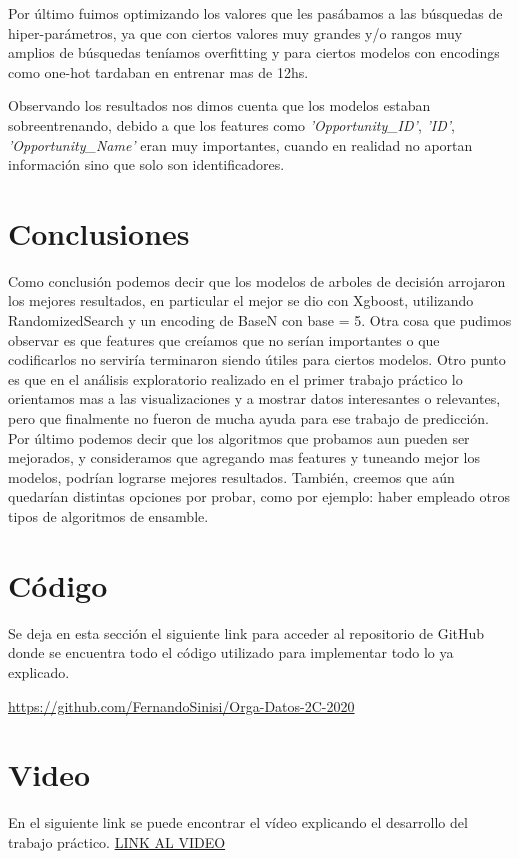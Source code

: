 \documentclass[12pt,a4paper]{article}
\begin{document}
Por último fuimos optimizando los valores que les pasábamos a las búsquedas de hiper-parámetros, ya que con ciertos valores muy grandes y/o rangos muy amplios de búsquedas teníamos overfitting y para ciertos modelos con encodings como one-hot tardaban en entrenar mas de 12hs.


Observando los resultados nos dimos cuenta que los modelos estaban sobreentrenando, debido a que los features como \textit{'Opportunity\_ID'}, \textit{'ID'}, \textit{'Opportunity\_Name'} eran muy importantes, cuando en realidad no aportan información sino que solo son identificadores.

\section{Conclusiones}

Como conclusión podemos decir que los modelos de arboles de decisión arrojaron los mejores resultados, en particular el mejor se dio con Xgboost, utilizando RandomizedSearch y un encoding de BaseN con base = 5.
Otra cosa que pudimos observar es que features que creíamos que no serían importantes o que codificarlos no serviría terminaron siendo útiles para ciertos modelos. \newline
Otro punto es que en el análisis exploratorio realizado en el primer trabajo práctico lo orientamos mas a las visualizaciones y a mostrar datos interesantes o relevantes, pero que finalmente no fueron de mucha ayuda para ese trabajo de predicción. \newline
Por último podemos decir que los algoritmos que probamos aun pueden ser mejorados, y consideramos que agregando mas features y tuneando mejor los modelos, podrían lograrse mejores resultados. También, creemos que aún quedarían distintas opciones por probar, como por ejemplo: haber empleado otros tipos de algoritmos de ensamble.

\section{Código}

Se deja en esta sección el siguiente link para acceder al repositorio de GitHub donde se encuentra todo el código utilizado para implementar todo lo ya explicado.

\url{https://github.com/FernandoSinisi/Orga-Datos-2C-2020}

\section{Video}

En el siguiente link se puede encontrar el vídeo explicando el desarrollo del trabajo práctico.
\url{LINK AL VIDEO}
\end{document}
